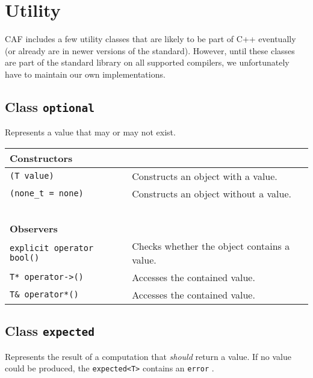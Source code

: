 \section{Utility}
\label{utility}

CAF includes a few utility classes that are likely to be part of C++
eventually (or already are in newer versions of the standard). However, until
these classes are part of the standard library on all supported compilers, we
unfortunately have to maintain our own implementations.

\subsection{Class \lstinline^optional^}
\label{optional}

Represents a value that may or may not exist.

\begin{center}
\begin{tabular}{ll}
  \textbf{Constructors} & ~ \\
  \hline
  \lstinline^(T value)^ & Constructs an object with a value. \\
  \hline
  \lstinline^(none_t = none)^ & Constructs an object without a value. \\
  \hline
  ~ & ~ \\ \textbf{Observers} & ~ \\
  \hline
  \lstinline^explicit operator bool()^ & Checks whether the object contains a value. \\
  \hline
  \lstinline^T* operator->()^ & Accesses the contained value. \\
  \hline
  \lstinline^T& operator*()^ & Accesses the contained value. \\
  \hline
\end{tabular}
\end{center}

\subsection{Class \lstinline^expected^}

Represents the result of a computation that \emph{should} return a value. If no
value could be produced, the \lstinline^expected<T>^ contains an
\lstinline^error^ .

